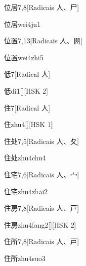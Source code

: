 \begin{entry}{位居}{7,8}[Radicais ⼈、⼫]
  \begin{phonetics}{位居}{wei4ju1}
  \end{phonetics}
\end{entry}

\begin{entry}{位置}{7,13}[Radicais ⼈、⽹]
  \begin{phonetics}{位置}{wei4zhi5}
  \end{phonetics}
\end{entry}

\begin{entry}{低}{7}[Radical ⼈]
  \begin{phonetics}{低}{di1}[][HSK 2]
  \end{phonetics}
\end{entry}

\begin{entry}{住}{7}[Radical ⼈]
  \begin{phonetics}{住}{zhu4}[][HSK 1]
  \end{phonetics}
\end{entry}

\begin{entry}{住处}{7,5}[Radicais ⼈、⼡]
  \begin{phonetics}{住处}{zhu4chu4}
  \end{phonetics}
\end{entry}

\begin{entry}{住宅}{7,6}[Radicais ⼈、⼧]
  \begin{phonetics}{住宅}{zhu4zhai2}
  \end{phonetics}
\end{entry}

\begin{entry}{住房}{7,8}[Radicais ⼈、⼾]
  \begin{phonetics}{住房}{zhu4fang2}[][HSK 2]
  \end{phonetics}
\end{entry}

\begin{entry}{住所}{7,8}[Radicais ⼈、⼾]
  \begin{phonetics}{住所}{zhu4suo3}
  \end{phonetics}
\end{entry}

